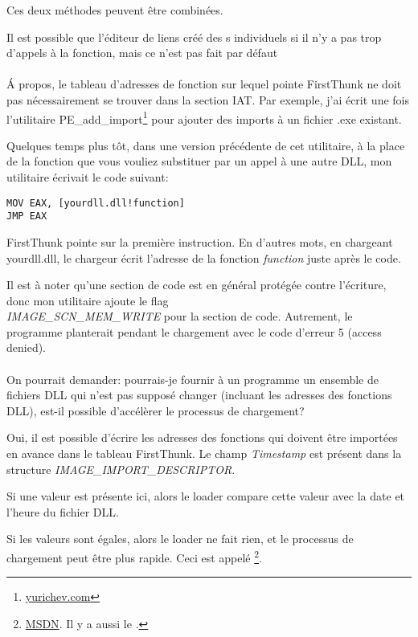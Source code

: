 Ces deux méthodes peuvent être combinées.

Il est possible que l'éditeur de liens créé des s individuels si il n'y
a pas trop d'appels à la fonction, mais ce n'est pas fait par défaut \\
\\
Á propos, le tableau d'adresses de fonction sur lequel pointe FirstThunk ne doit
pas nécessairement se trouver dans la section \ac{IAT}. Par exemple, j'ai écrit une
fois l'utilitaire PE\_add\_import\footnote{\href{http://go.yurichev.com/17049}{yurichev.com}}
pour ajouter des imports à un fichier .exe existant.

Quelques temps plus tôt, dans une version précédente de cet utilitaire, à la place
de la fonction que vous vouliez substituer par un appel à une autre DLL, mon utilitaire
écrivait le code suivant:

\begin{lstlisting}
MOV EAX, [yourdll.dll!function]
JMP EAX
\end{lstlisting}

FirstThunk pointe sur la première instruction. En d'autres mots, en chargeant yourdll.dll,
le chargeur écrit l'adresse de la fonction \emph{function} juste après le code.

Il est à noter qu'une section de code est en général protégée contre l'écriture,
donc mon utilitaire ajoute le flag \\
\emph{IMAGE\_SCN\_MEM\_WRITE}
pour la section de code. Autrement, le programme planterait pendant le chargement
avec le code d'erreur 5 (access denied). \\
\\
On pourrait demander: pourrais-je fournir à un programme un ensemble de fichiers
DLL qui n'est pas supposé changer (incluant les adresses des fonctions DLL), est-il
possible d'accélèrer le processus de chargement?

Oui, il est possible d'écrire les adresses des fonctions qui doivent être importées
en avance dans le tableau FirstThunk. Le champ \emph{Timestamp} est présent dans la
structure \emph{IMAGE\_IMPORT\_DESCRIPTOR}.

Si une valeur est présente ici, alors le loader compare cette valeur avec la date
et l'heure du fichier DLL.

Si les valeurs sont égales, alors le loader ne fait rien, et le processus de chargement
peut être plus rapide.
Ceci est appelé 
\footnote{\href{http://go.yurichev.com/17050}{MSDN}. Il y a aussi le .}.

